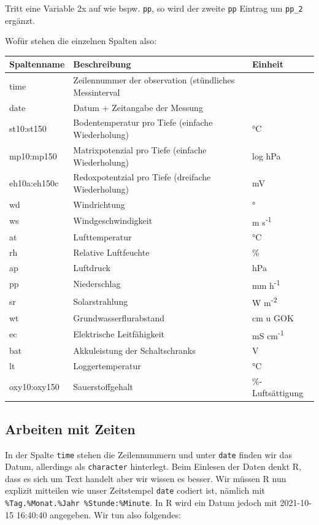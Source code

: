 \documentclass[
]{article}
\begin{document}
Tritt eine Variable 2x auf wie bspw. \texttt{pp}, so wird der zweite \texttt{pp} Eintrag um \texttt{pp\_2} ergänzt.

Wofür stehen die einzelnen Spalten also:

\begin{longtable}[]{@{}lll@{}}
\toprule
Spaltenname & Beschreibung & Einheit \\
\midrule
\endhead
time & Zeilennummer der observation (stündliches Messinterval & \\
date & Datum + Zeitangabe der Messung & \\
st10:st150 & Bodentemperatur pro Tiefe (einfache Wiederholung) & °C \\
mp10:mp150 & Matrixpotenzial pro Tiefe (einfache Wiederholung) & log hPa \\
eh10a:eh150c & Redoxpotentzial pro Tiefe (dreifache Wiederholung) & mV \\
wd & Windrichtung & ° \\
ws & Windgeschwindigkeit & m s\textsuperscript{-1} \\
at & Lufttemperatur & °C \\
rh & Relative Luftfeuchte & \% \\
ap & Luftdruck & hPa \\
pp & Niederschlag & mm h\textsuperscript{-1} \\
sr & Solarstrahlung & W m\textsuperscript{-2} \\
wt & Grundwasserflurabstand & cm u GOK \\
ec & Elektrische Leitfähigkeit & mS cm\textsuperscript{-1} \\
bat & Akkuleistung der Schaltschranks & V \\
lt & Loggertemperatur & °C \\
oxy10:oxy150 & Sauerstoffgehalt & \%-Luftsättigung \\
\bottomrule
\end{longtable}

\hypertarget{arbeiten-mit-zeiten}{%
\subsection{Arbeiten mit Zeiten}\label{arbeiten-mit-zeiten}}

In der Spalte \texttt{time} stehen die Zeilennummern und unter \texttt{date} finden wir das Datum, allerdings als \texttt{character} hinterlegt. Beim Einlesen der Daten denkt R, dass es sich um Text handelt aber wir wissen es besser. Wir müssen R nun explizit mitteilen wie unser Zeitstempel \texttt{date} codiert ist, nämlich mit \texttt{\%Tag.\%Monat.\%Jahr\ \%Stunde:\%Minute}. In R wird ein Datum jedoch mit 2021-10-15 16:40:40 angegeben. Wir tun also folgendes:
\end{document}

